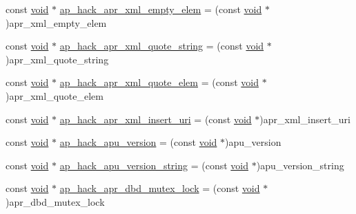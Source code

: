 \begin{DoxyCompactItemize}
\item 
const \hyperlink{group__MOD__ISAPI_gacd6cdbf73df3d9eed42fa493d9b621a6}{void} $\ast$ \hyperlink{srclib_2apr-util_2exports_8c_ab4f8a2c9eae196fcd5b308a5f0b7b48a}{ap\+\_\+hack\+\_\+apr\+\_\+xml\+\_\+empty\+\_\+elem} = (const \hyperlink{group__MOD__ISAPI_gacd6cdbf73df3d9eed42fa493d9b621a6}{void} $\ast$)apr\+\_\+xml\+\_\+empty\+\_\+elem
\item 
const \hyperlink{group__MOD__ISAPI_gacd6cdbf73df3d9eed42fa493d9b621a6}{void} $\ast$ \hyperlink{srclib_2apr-util_2exports_8c_a5c6e36a4e3e1ea8f5476eedb2ce6b642}{ap\+\_\+hack\+\_\+apr\+\_\+xml\+\_\+quote\+\_\+string} = (const \hyperlink{group__MOD__ISAPI_gacd6cdbf73df3d9eed42fa493d9b621a6}{void} $\ast$)apr\+\_\+xml\+\_\+quote\+\_\+string
\item 
const \hyperlink{group__MOD__ISAPI_gacd6cdbf73df3d9eed42fa493d9b621a6}{void} $\ast$ \hyperlink{srclib_2apr-util_2exports_8c_a31bd3f1498b3c11d107dfac248965301}{ap\+\_\+hack\+\_\+apr\+\_\+xml\+\_\+quote\+\_\+elem} = (const \hyperlink{group__MOD__ISAPI_gacd6cdbf73df3d9eed42fa493d9b621a6}{void} $\ast$)apr\+\_\+xml\+\_\+quote\+\_\+elem
\item 
const \hyperlink{group__MOD__ISAPI_gacd6cdbf73df3d9eed42fa493d9b621a6}{void} $\ast$ \hyperlink{srclib_2apr-util_2exports_8c_ad36cb81c48993415554134959676d10d}{ap\+\_\+hack\+\_\+apr\+\_\+xml\+\_\+insert\+\_\+uri} = (const \hyperlink{group__MOD__ISAPI_gacd6cdbf73df3d9eed42fa493d9b621a6}{void} $\ast$)apr\+\_\+xml\+\_\+insert\+\_\+uri
\item 
const \hyperlink{group__MOD__ISAPI_gacd6cdbf73df3d9eed42fa493d9b621a6}{void} $\ast$ \hyperlink{srclib_2apr-util_2exports_8c_afd5cbcdb31cd718e91bd8dd45f40a9e9}{ap\+\_\+hack\+\_\+apu\+\_\+version} = (const \hyperlink{group__MOD__ISAPI_gacd6cdbf73df3d9eed42fa493d9b621a6}{void} $\ast$)apu\+\_\+version
\item 
const \hyperlink{group__MOD__ISAPI_gacd6cdbf73df3d9eed42fa493d9b621a6}{void} $\ast$ \hyperlink{srclib_2apr-util_2exports_8c_ab8f918464104fc14d1c54da2b75952b3}{ap\+\_\+hack\+\_\+apu\+\_\+version\+\_\+string} = (const \hyperlink{group__MOD__ISAPI_gacd6cdbf73df3d9eed42fa493d9b621a6}{void} $\ast$)apu\+\_\+version\+\_\+string
\item 
const \hyperlink{group__MOD__ISAPI_gacd6cdbf73df3d9eed42fa493d9b621a6}{void} $\ast$ \hyperlink{srclib_2apr-util_2exports_8c_afedfdd34881730db1dba99da1f13145b}{ap\+\_\+hack\+\_\+apr\+\_\+dbd\+\_\+mutex\+\_\+lock} = (const \hyperlink{group__MOD__ISAPI_gacd6cdbf73df3d9eed42fa493d9b621a6}{void} $\ast$)apr\+\_\+dbd\+\_\+mutex\+\_\+lock

\end{DoxyCompactItemize}

